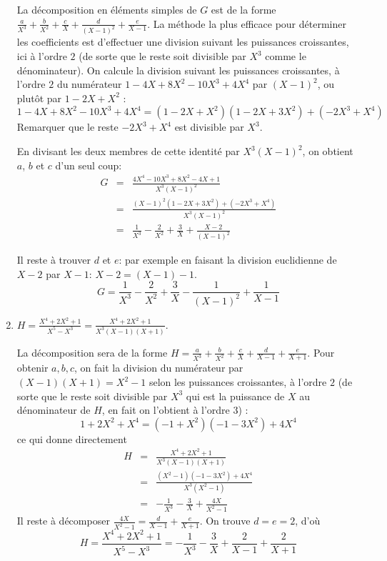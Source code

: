 \documentclass[11pt,a4paper]{article}
\begin{document}
\begin{enumerate}
La décomposition en éléments simples de $G$ est de la forme
$\frac{a}{X^3}+\frac{b}{X^2}+\frac{c}{X}+\frac{d}{(X-1)^2}+\frac{e}{X-1}$.
La méthode la plus efficace pour déterminer les coefficients est d'effectuer une division suivant les puissances
croissantes, ici à l'ordre $2$ (de sorte que le reste soit divisible par $X^3$ comme le dénominateur).
On calcule la division suivant les puissances
croissantes, à l'ordre $2$ du numérateur $1-4X+8X ^2-10X^3+4X^4$ par $(X-1)^2$, ou plutôt par $1-2X+X^2$ :
$$1-4X+8X^2-10X^3+4X^4=(1-2X+X^2)(1-2X+3X^2)+(-2X^3+X^4)$$
Remarquer que le reste $-2X^3+X^4$ est divisible par $X^3$.

En divisant les deux membres de cette identité par $X^3(X-1)^2$, 
on obtient $a$, $b$ et $c$ d'un seul coup:
$$
\begin{array}{rcl}
G & = & \frac{4X^4-10X^3+8X^2-4X+1}{X^3(X-1)^2}   \\
  & = & \frac{(X-1)^2(1-2X+3X^2)+(-2X^3+X^4)}{X^3(X-1)^2} \\
  & = & \frac{1}{X^3}-\frac{2}{X^2}+\frac{3}{X}+\frac{X-2}{(X-1)^2}
\end{array}
$$

Il reste à trouver $d$ et $e$: par exemple en faisant la division euclidienne de $X-2$ par $X-1$: $X-2=(X-1)-1$.
$$G=\frac{1}{X^3}-\frac{2}{X^2}+\frac{3}{X}-\frac{1}{(X-1)^2}+\frac{1}{X-1}$$

\item $H=\frac{X^4+2X^2+1}{X^5-X^3} = \frac{X^4+2X^2+1}{X^3(X-1)(X+1)}$.

La décomposition sera de la forme 
$H=\frac{a}{X^3}+\frac{b}{X^2}+\frac{c}{X}+\frac{d}{X-1}+\frac{e}{X+1}$. 
Pour obtenir $a, b, c$, on fait la division du numérateur par $(X-1)(X+1) = X^2-1$ 
selon les puissances croissantes, à l'ordre $2$ (de sorte que le reste soit divisible par $X^3$ qui est la puissance de $X$ au dénominateur de $H$,
en fait on l'obtient à l'ordre $3$) :
$$1+2X^2+X^4=(-1+X^2)(-1-3X^2)+4X^4$$
ce qui donne directement
$$
\begin{array}{rcl}
H 
&=& \frac{X^4+2X^2+1}{X^3(X-1)(X+1)} \\
&=& \frac{(X^2-1)(-1-3X^2)+4X^4}{X^3(X^2-1)} \\
&=& -\frac{1}{X^3}-\frac{3}{X}+\frac{4X}{X^2-1}  
\end{array}
$$
Il reste à décomposer $\frac{4X}{X^2-1}=\frac{d}{X-1}+\frac{e}{X+1}$. On trouve $d=e=2$, d'où
$$H = \frac{X^4+2X^2+1}{X^5-X^3} =-\frac{1}{X^3}-\frac{3}{X}+\frac{2}{X-1}+\frac{2}{X+1}$$ 


\end{enumerate}
\end{document}
